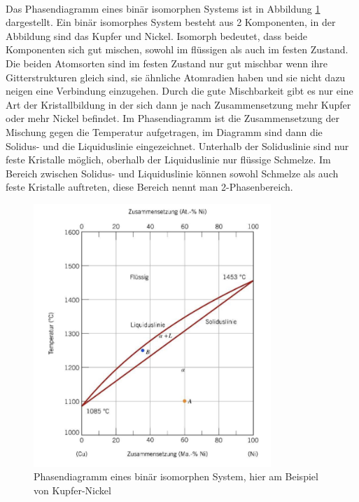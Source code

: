 \documentclass[11pt,a4paper]{article}
\numberwithin{equation}{section}
\numberwithin{figure}{section}
\begin{document}
\\
\begin{addmargin}[25pt]{0pt}
Das Phasendiagramm eines binär isomorphen Systems ist in Abbildung \ref{fig:Phasendiagramm_binar_isomorph} dargestellt. Ein binär isomorphes System besteht aus 2 Komponenten, in der Abbildung sind das Kupfer und Nickel. Isomorph bedeutet, dass beide Komponenten sich gut mischen, sowohl im flüssigen als auch im festen Zustand. Die beiden Atomsorten sind im festen Zustand nur gut mischbar wenn ihre Gitterstrukturen gleich sind, sie ähnliche Atomradien haben und sie nicht dazu neigen eine Verbindung einzugehen. Durch die gute Mischbarkeit gibt es nur eine Art der Kristallbildung in der sich dann je nach Zusammensetzung mehr Kupfer oder mehr Nickel befindet. Im Phasendiagramm ist die Zusammensetzung der Mischung gegen die Temperatur aufgetragen, im Diagramm sind dann die Solidus- und die Liquiduslinie eingezeichnet. Unterhalb der Soliduslinie sind nur feste Kristalle möglich, oberhalb der Liquiduslinie nur flüssige Schmelze. Im Bereich zwischen Solidus- und Liquiduslinie können sowohl Schmelze als auch feste Kristalle auftreten, diese Bereich nennt man 2-Phasenbereich.\\
\begin{figure}[h]
    \centering
    \includegraphics[width = 0.8\textwidth]{images/Materialwissenschaften/Phasendiagramm_binar_isomorph.jpeg}
    \caption{Phasendiagramm eines binär isomorphen System, hier am Beispiel von Kupfer-Nickel}
    \label{fig:Phasendiagramm_binar_isomorph}
\end{figure}
\end{addmargin}
\end{document}
